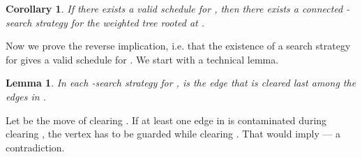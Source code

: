\documentclass[10pt]{article}
\newenvironment{proof}[1][Proof]
{\par\noindent{\bf #1:} }{\hspace*{\fill}\nolinebreak{}\bigskip\par}
\newtheorem{lemma}{Lemma}
\newtheorem{corollary}{Corollary}
\begin{document}
\begin{corollary} \label{cor:scheduling_to_search}
If there exists a valid schedule for , then there exists a connected -search strategy for the weighted tree  rooted at .
\end{corollary}

Now we prove the reverse implication, i.e. that the existence of a search strategy for  gives a valid schedule for . We start with a technical lemma.
\begin{lemma} \label{lem:ry_0_cleared_last}
In each -search strategy  for ,  is the edge that is cleared last among the edges in .
\end{lemma}
\begin{proof}
Let  be the move of clearing . If at least one edge in  is contaminated during clearing , the vertex  has to be guarded while clearing . That would imply  --- a contradiction.
\end{proof}
\end{document}
